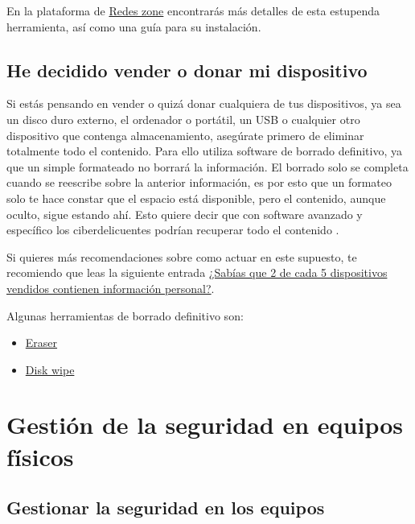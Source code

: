 \documentclass[
  a4paper,
  openany]{book}
\begin{document}
En la plataforma de \href{https://www.redeszone.net/tutoriales/seguridad/cryptomator-encriptar-archivos-carpetas/}{Redes zone} encontrarás más detalles de esta estupenda herramienta, así como una guía para su instalación.

\hypertarget{he-decidido-vender-o-donar-mi-dispositivo}{%
\section{He decidido vender o donar mi dispositivo}\label{he-decidido-vender-o-donar-mi-dispositivo}}

Si estás pensando en vender o quizá donar cualquiera de tus dispositivos, ya sea un disco duro externo, el ordenador o portátil, un USB o cualquier otro dispositivo que contenga almacenamiento, asegúrate primero de eliminar totalmente todo el contenido. Para ello utiliza software de borrado definitivo, ya que un simple formateado no borrará la información. El borrado solo se completa cuando se reescribe sobre la anterior información, es por esto que un formateo solo te hace constar que el espacio está disponible, pero el contenido, aunque oculto, sigue estando ahí. Esto quiere decir que con software avanzado y específico los ciberdelicuentes podrían recuperar todo el contenido \citep{XATAKA-borrado-almacenamiento}.

Si quieres más recomendaciones sobre como actuar en este supuesto, te recomiendo que leas la siguiente entrada \href{https://www.osi.es/es/actualidad/blog/2019/10/09/sabias-que-2-de-cada-5-dispositivos-vendidos-contienen-informacion}{¿Sabías que 2 de cada 5 dispositivos vendidos contienen información personal?}.

Algunas herramientas de borrado definitivo son:

\begin{itemize}
\item
  \href{https://eraser.heidi.ie/}{Eraser}
\item
  \href{https://www.diskwipe.org/download.php}{Disk wipe}
\end{itemize}

\hypertarget{gestiuxf3n-de-la-seguridad-en-equipos-fuxedsicos}{%
\chapter{Gestión de la seguridad en equipos físicos}\label{gestiuxf3n-de-la-seguridad-en-equipos-fuxedsicos}}

\hypertarget{gestionar-la-seguridad-en-los-equipos}{%
\section{Gestionar la seguridad en los equipos}\label{gestionar-la-seguridad-en-los-equipos}}
\end{document}
